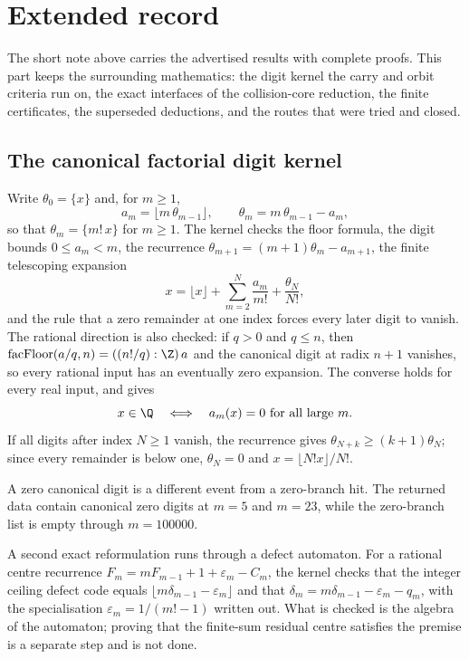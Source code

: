 \documentclass[11pt]{article}
\begin{document}
\section{Extended record}\label{long68:sec:extended-record}

The short note above carries the advertised results with complete proofs.
This part keeps the surrounding mathematics: the digit kernel the carry and
orbit criteria run on, the exact interfaces of the collision-core reduction,
the finite certificates, the superseded deductions, and the routes that were
tried and closed.

\subsection{The canonical factorial digit kernel}\label{long68:sec:ext-digits}

Write $\theta_0=\{x\}$ and, for $m\ge1$,
\[
 a_m=\lfloor m\,\theta_{m-1}\rfloor,\qquad \theta_m=m\,\theta_{m-1}-a_m ,
\]
so that $\theta_m=\{m!\,x\}$ for $m\ge1$.  The kernel checks the floor
formula, the digit bounds $0\le a_m<m$, the recurrence
$\theta_{m+1}=(m+1)\theta_m-a_{m+1}$, the finite telescoping expansion
\[
 x=\lfloor x\rfloor+\sum_{m=2}^{N}\frac{a_m}{m!}+\frac{\theta_N}{N!},
\]
and the rule that a zero remainder at one index forces every later digit to
vanish.  The rational direction is also checked: if $q>0$ and $q\le n$, then
$\operatorname{facFloor}(a/q,n)=((n!/q):\Z)\,a$ and the canonical digit at
radix $n+1$ vanishes, so every rational input has an eventually zero
expansion.  The converse holds for every real input, and gives
\[
 x\in\Q\quad\Longleftrightarrow\quad a_m(x)=0\ \hbox{for all large }m .
\]
If all digits after index $N\ge1$ vanish, the recurrence gives
$\theta_{N+k}\ge(k+1)\theta_N$; since every remainder is below one,
$\theta_N=0$ and $x=\lfloor N!x\rfloor/N!$.

A zero canonical digit is a different event from a zero-branch hit.  The
returned data contain canonical zero digits at $m=5$ and $m=23$, while the
zero-branch list is empty through $m=100000$.

A second exact reformulation runs through a defect automaton.  For a rational
centre recurrence $F_m=mF_{m-1}+1+\varepsilon_m-C_m$, the kernel checks that
the integer ceiling defect code equals
$\lfloor m\delta_{m-1}-\varepsilon_m\rfloor$ and that
$\delta_m=m\delta_{m-1}-\varepsilon_m-q_m$, with the specialisation
$\varepsilon_m=1/(m!-1)$ written out.  What is checked is the algebra of the
automaton; proving that the finite-sum residual centre satisfies the premise
is a separate step and is not done.
\end{document}

